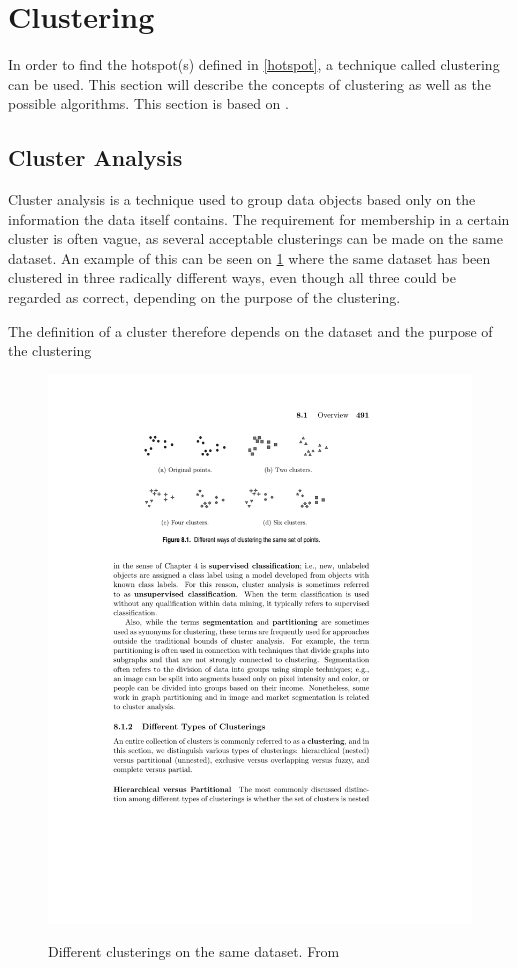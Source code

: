 \section{Clustering}\label{clustering}
In order to find the hotspot(s) defined in \cref{hotspot}, a technique called clustering can be used.
This section will describe the concepts of clustering as well as the possible algorithms.
This section is based on \citet{pang2006introduction}.

\subsection{Cluster Analysis}
Cluster analysis is a technique used to group data objects based only on the information the data itself contains.
The requirement for membership in a certain cluster is often vague, as several acceptable clusterings can be made on the same dataset.
An example of this can be seen on \cref{clusterings} where the same dataset has been clustered in three radically different ways, even though all three could be regarded as correct, depending on the purpose of the clustering.

The definition of a cluster therefore depends on the dataset and the purpose of the clustering 

\begin{figure}[H]
\includegraphics[trim= 3.1cm 20.61cm 5cm 2.5cm, clip=true]{graphics/different_clusters}
\centering
\label{clusterings}
\caption{Different clusterings on the same dataset. From \citet{pang2006introduction}}
\end{figure}


